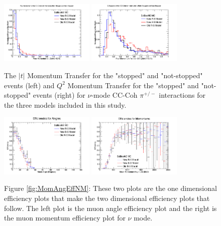 \documentclass[11pt]{article}
\begin{document}
\begin{figure}[H]
\centering
\includegraphics[width=0.4\textwidth]{CCCohPlots/NMCCCohGoodT.png}
\includegraphics[width=0.4\textwidth]{CCCohPlots/NMCCCohGoodQ2.png}
\caption{The $|t|$ Momentum Transfer for the "stopped" and "not-stopped" events (left) and $Q^2$ Momentum Transfer for the "stopped" and "not-stopped" events (right) for $\nu$-mode CC-Coh $\pi^{+/-}$ interactions for the three models included in this study.}
\end{figure}\label{fig:AntiNuModeCCCohGoodTAndQ2}




\begin{figure}[H]
\centering
\includegraphics[width=0.4\textwidth]{NMCombinedPlotsImages/24-NMCombinedPlots.png}
\includegraphics[width=0.4\textwidth]{NMCombinedPlotsImages/25-NMCombinedPlots.png}
\caption*{Figure \ref*{fig:MomAngEffNM}: These two plots are the one dimensional efficiency plots that make the two dimensional efficiency plots that follow. The left plot is the muon angle efficiency plot and the right is the muon momentum efficiency plot for $\nu$ mode.}
\end{figure}\label{fig:MomAngEffNM}
\end{document}
